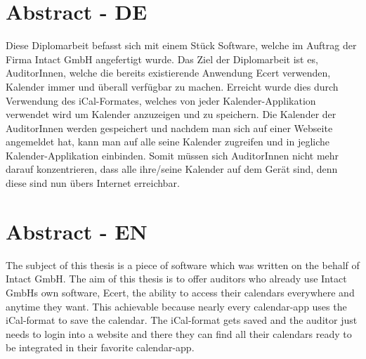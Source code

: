 

\chapter*{Abstract - DE}
\label{cha:abstract}

Diese Diplomarbeit befasst sich mit einem Stück Software, welche im Auftrag der Firma Intact GmbH angefertigt wurde. Das Ziel der Diplomarbeit ist es, AuditorInnen, welche die bereits existierende Anwendung Ecert verwenden, Kalender immer und überall verfügbar zu machen. Erreicht wurde dies durch Verwendung des iCal-Formates, welches von jeder Kalender-Applikation verwendet wird um Kalender anzuzeigen und zu speichern. Die Kalender der AuditorInnen werden gespeichert und nachdem man sich auf einer Webseite angemeldet hat, kann man auf alle seine Kalender zugreifen und in jegliche Kalender-Applikation einbinden. Somit müssen sich AuditorInnen nicht mehr darauf konzentrieren, dass alle ihre/seine Kalender auf dem Gerät sind, denn diese sind nun übers Internet erreichbar. 
\vspace{20px}
\linebreak
\pagebreak

\pagebreak

\chapter*{Abstract - EN}
\label{cha:abstract}
The subject of this thesis is a piece of software which was written on the behalf of Intact GmbH. The aim of this thesis is to offer auditors who already use Intact GmbHs own software, Ecert, the ability to access their calendars everywhere and anytime they want. This achievable because nearly every calendar-app uses the iCal-format to save the calendar. The iCal-format gets saved and the auditor just needs to login into a website and there they can find all their calendars ready to be integrated in their favorite calendar-app.

